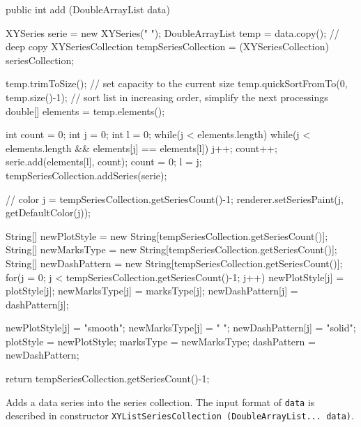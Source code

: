 \begin{htmlonly}
\end{htmlonly}
\begin{code}

   public int add (DoubleArrayList data) \begin{hide} {
      XYSeries serie = new XYSeries(" ");
      DoubleArrayList temp = data.copy();  // deep copy
      XYSeriesCollection tempSeriesCollection = (XYSeriesCollection) seriesCollection;

      temp.trimToSize();      // set capacity to the current size
      temp.quickSortFromTo(0, temp.size()-1);   // sort list in increasing order, simplify the next processings
      double[] elements = temp.elements();

      int count = 0;
      int j = 0;
      int l = 0;
      while(j < elements.length) {
         while(j < elements.length && elements[j] == elements[l]) {
            j++;
            count++;
         }
         serie.add(elements[l], count);
         count = 0;
         l = j;
      }
      tempSeriesCollection.addSeries(serie);

      // color
      j = tempSeriesCollection.getSeriesCount()-1;
      renderer.setSeriesPaint(j, getDefaultColor(j));

      String[] newPlotStyle = new String[tempSeriesCollection.getSeriesCount()];
      String[] newMarksType = new String[tempSeriesCollection.getSeriesCount()];
      String[] newDashPattern = new String[tempSeriesCollection.getSeriesCount()];
      for(j = 0; j < tempSeriesCollection.getSeriesCount()-1; j++) {
         newPlotStyle[j] = plotStyle[j];
         newMarksType[j] = marksType[j];
         newDashPattern[j] = dashPattern[j];
      }

      newPlotStyle[j] = "smooth";
      newMarksType[j] = " ";
      newDashPattern[j] = "solid";
      plotStyle = newPlotStyle;
      marksType = newMarksType;
      dashPattern = newDashPattern;

      return tempSeriesCollection.getSeriesCount()-1;
   }\end{hide}
\end{code}
\begin{tabb}
   Adds a data series into the series collection. The input format of
 \texttt{data} is described in constructor
\texttt{XYListSeriesCollection (DoubleArrayList... data)}.
\end{tabb}
